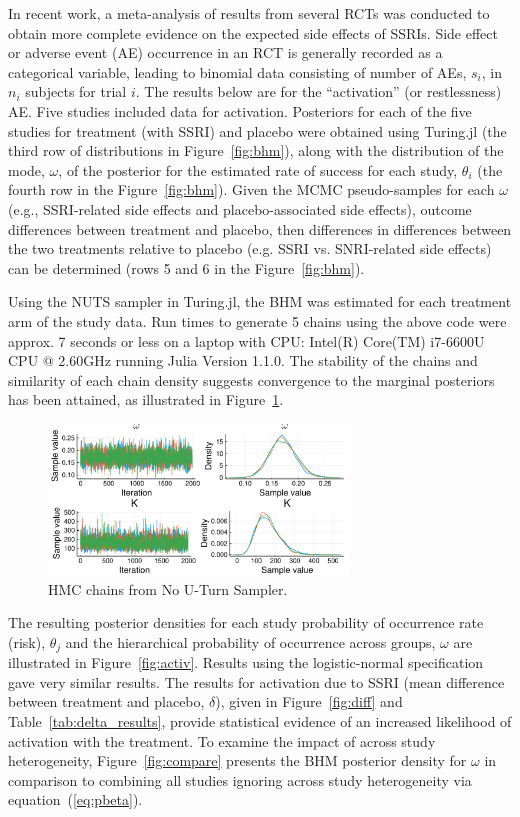 \documentclass{juliacon}
\begin{document}
In recent work\cite{Mills2019b}, a meta-analysis of results from several RCTs was conducted to obtain more complete evidence on the expected side effects of SSRIs.  Side effect or adverse event (AE) occurrence in an RCT is generally recorded as a categorical variable, leading to binomial data consisting of number of AEs, $s_i$, in $n_i$ subjects for trial $i$. The results below are for the  “activation” (or restlessness) AE.  Five studies included data for activation.  Posteriors for each of the five studies for treatment (with SSRI) and placebo were obtained using Turing.jl (the third row of distributions in Figure~\ref{fig:bhm}), along with the distribution of the mode, $\omega$, of the posterior for the estimated rate of success for each study, $\theta_i$ (the fourth row in the Figure~\ref{fig:bhm}).  Given the MCMC pseudo-samples for each $\omega$ (e.g., SSRI-related side effects and placebo-associated side effects), outcome differences between treatment and placebo, then differences in differences between the two treatments relative to placebo (e.g. SSRI vs. SNRI-related side effects) can be determined (rows 5 and 6 in the Figure~\ref{fig:bhm}).
\vskip 6pt

Using the NUTS sampler in Turing.jl, the BHM was estimated for each treatment arm of the study data. Run times to generate 5 chains using the above code were approx. 7 seconds or less on a laptop with CPU: Intel(R) Core(TM) i7-6600U CPU @ 2.60GHz running Julia Version 1.1.0. The stability of the chains and similarity of each chain density suggests convergence to the marginal posteriors has been attained, as illustrated in Figure~\ref{fig:chains}.
\begin{figure}[t]
	\centerline{\includegraphics[width=8cm]{omega_K_mcmcplot.pdf}}
	\caption{HMC chains from No U-Turn Sampler.}
	\label{fig:chains}
	\end{figure}

The resulting posterior densities for each study probability of occurrence rate (risk), $\theta_j$ and the hierarchical probability of occurrence across groups, $\omega$ are illustrated in Figure~\ref{fig:activ}. Results using the logistic-normal specification gave very similar results. The results for activation due to SSRI (mean difference between treatment and placebo, $\delta$), given in Figure~\ref{fig:diff} and Table~\ref{tab:delta_results}, provide statistical evidence of an increased likelihood of activation with the treatment. To examine the impact of across study heterogeneity, Figure~\ref{fig:compare} presents the BHM posterior density for $\omega$ in comparison to combining all studies ignoring across study heterogeneity via equation~(\ref{eq:pbeta}).
\end{document}
